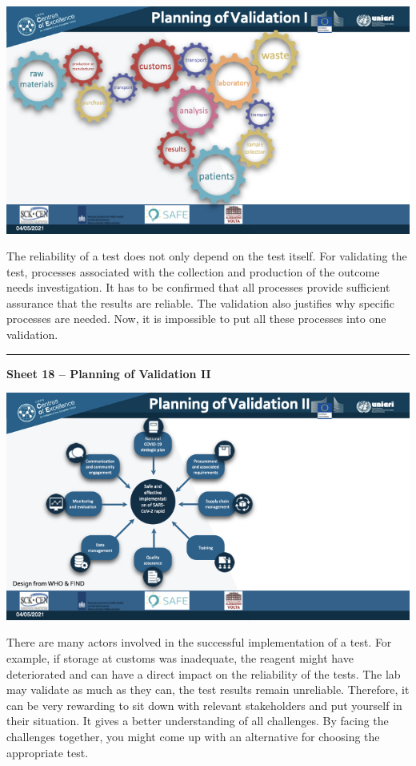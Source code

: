 \documentclass[
]{book}
\begin{document}
\includegraphics{images/m02/m02_types_of_rapid_tests_final.017.jpeg}

The reliability of a test does not only depend on the test itself. For
validating the test, processes associated with the collection and
production of the outcome needs investigation. It has to be confirmed
that all processes provide sufficient assurance that the results are
reliable. The validation also justifies why specific processes are
needed. Now, it is impossible to put all these processes into one
validation.

\begin{center}\rule{0.5\linewidth}{0.5pt}\end{center}

\textbf{Sheet 18 -- Planning of Validation II}

\includegraphics{images/m02/m02_types_of_rapid_tests_final.018.jpeg}

There are many actors involved in the successful implementation of a
test. For example, if storage at customs was inadequate, the reagent
might have deteriorated and can have a direct impact on the reliability
of the tests. The lab may validate as much as they can, the test results
remain unreliable. Therefore, it can be very rewarding to sit down with
relevant stakeholders and put yourself in their situation. It gives a
better understanding of all challenges. By facing the challenges
together, you might come up with an alternative for choosing the
appropriate test.
\end{document}
